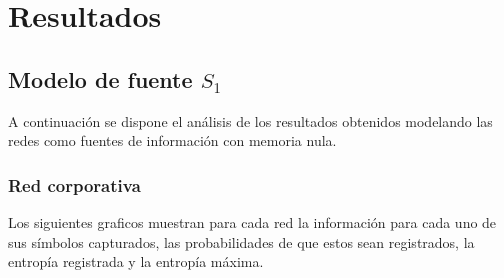 \section{Resultados}

\subsection{Modelo de fuente \texorpdfstring{$S_1$}{S1}}

A continuación se dispone el análisis de los resultados obtenidos modelando las redes como fuentes de información con memoria nula.

\subsubsection{Red corporativa}

Los siguientes graficos muestran para cada red la información para cada uno de sus símbolos capturados, las probabilidades de que estos sean registrados, la entropía registrada y la entropía máxima.

